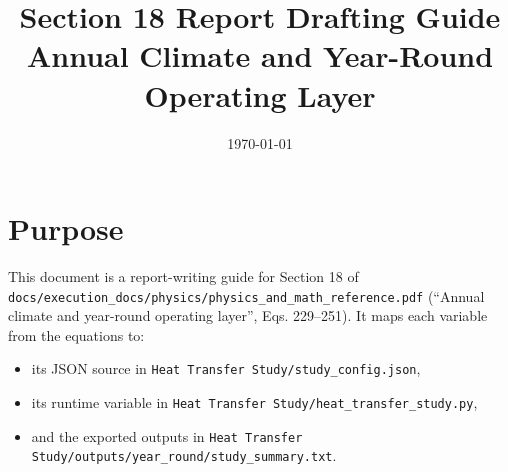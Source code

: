 \documentclass[11pt]{article}
\begin{document}
\title{Section 18 Report Drafting Guide\\Annual Climate and Year-Round Operating Layer}
\author{}
\date{\today}
\maketitle

\section{Purpose}
This document is a report-writing guide for Section 18 of
\texttt{docs/execution\_docs/physics/physics\_and\_math\_reference.pdf}
(``Annual climate and year-round operating layer'', Eqs. 229--251).
It maps each variable from the equations to:
\begin{itemize}[leftmargin=*]
\item its JSON source in \texttt{Heat Transfer Study/study\_config.json},
\item its runtime variable in \texttt{Heat Transfer Study/heat\_transfer\_study.py},
\item and the exported outputs in \texttt{Heat Transfer Study/outputs/year\_round/study\_summary.txt}.
\end{itemize}
\end{document}
